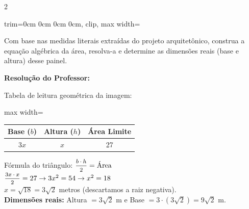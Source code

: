 \begin{multicols*}{2}
\begin{center}
\begin{adjustbox}{trim=0cm 0cm 0cm 0cm, clip, max width=\larguraTikz}
\end{adjustbox}
\end{center}

Com base nas medidas literais extraídas do projeto arquitetônico, construa a equação algébrica da área, resolva-a e determine as dimensões reais (base e altura) desse painel.

\ifgabarito
    \begin{tcolorbox}[colback=CorTitUm!5, colframe=CorTitUm, boxrule=1pt, arc=4pt, left=6pt, right=6pt, top=6pt, bottom=6pt]
    \small\textbf{\textcolor{CorTitUm}{Resolução do Professor:}}\par\vspace{0.1cm}
    \color{CinzaEscuro}
    Tabela de leitura geométrica da imagem:
    \vspace{0.1cm}
    \begin{center}
    \begin{adjustbox}{max width=\linewidth}
    \begin{tabular}{|c|c|c|}
    \hline
    \textbf{Base ($b$)} & \textbf{Altura ($h$)} & \textbf{Área Limite} \\
    \hline
    $3x$ & $x$ & 27 \\
    \hline
    \end{tabular}
    \end{adjustbox}
    \end{center}
    \vspace{0.1cm}
    Fórmula do triângulo: $\mfrac{b \cdot h}{2} = \text{Área}$\\
    $\mfrac{3x \cdot x}{2} = 27 \rightarrow 3x^2 = 54 \rightarrow x^2 = 18$\\
    $x = \sqrt{18} = 3\sqrt{2}$ metros (descartamos a raiz negativa).\\
    \textbf{Dimensões reais:} Altura $= 3\sqrt{2}$ m e Base $= 3 \cdot (3\sqrt{2}) = 9\sqrt{2}$ m.
    \end{tcolorbox}
\fi


\end{multicols*}
